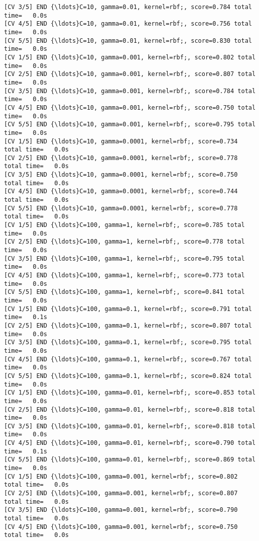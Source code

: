 \documentclass[11pt]{article}
\begin{document}
\begin{Verbatim}[commandchars=\\\{\}]
[CV 3/5] END {\ldots}C=10, gamma=0.01, kernel=rbf;, score=0.784 total time=   0.0s
[CV 4/5] END {\ldots}C=10, gamma=0.01, kernel=rbf;, score=0.756 total time=   0.0s
[CV 5/5] END {\ldots}C=10, gamma=0.01, kernel=rbf;, score=0.830 total time=   0.0s
[CV 1/5] END {\ldots}C=10, gamma=0.001, kernel=rbf;, score=0.802 total time=   0.0s
[CV 2/5] END {\ldots}C=10, gamma=0.001, kernel=rbf;, score=0.807 total time=   0.0s
[CV 3/5] END {\ldots}C=10, gamma=0.001, kernel=rbf;, score=0.784 total time=   0.0s
[CV 4/5] END {\ldots}C=10, gamma=0.001, kernel=rbf;, score=0.750 total time=   0.0s
[CV 5/5] END {\ldots}C=10, gamma=0.001, kernel=rbf;, score=0.795 total time=   0.0s
[CV 1/5] END {\ldots}C=10, gamma=0.0001, kernel=rbf;, score=0.734 total time=   0.0s
[CV 2/5] END {\ldots}C=10, gamma=0.0001, kernel=rbf;, score=0.778 total time=   0.0s
[CV 3/5] END {\ldots}C=10, gamma=0.0001, kernel=rbf;, score=0.750 total time=   0.0s
[CV 4/5] END {\ldots}C=10, gamma=0.0001, kernel=rbf;, score=0.744 total time=   0.0s
[CV 5/5] END {\ldots}C=10, gamma=0.0001, kernel=rbf;, score=0.778 total time=   0.0s
[CV 1/5] END {\ldots}C=100, gamma=1, kernel=rbf;, score=0.785 total time=   0.0s
[CV 2/5] END {\ldots}C=100, gamma=1, kernel=rbf;, score=0.778 total time=   0.0s
[CV 3/5] END {\ldots}C=100, gamma=1, kernel=rbf;, score=0.795 total time=   0.0s
[CV 4/5] END {\ldots}C=100, gamma=1, kernel=rbf;, score=0.773 total time=   0.0s
[CV 5/5] END {\ldots}C=100, gamma=1, kernel=rbf;, score=0.841 total time=   0.0s
[CV 1/5] END {\ldots}C=100, gamma=0.1, kernel=rbf;, score=0.791 total time=   0.1s
[CV 2/5] END {\ldots}C=100, gamma=0.1, kernel=rbf;, score=0.807 total time=   0.0s
[CV 3/5] END {\ldots}C=100, gamma=0.1, kernel=rbf;, score=0.795 total time=   0.0s
[CV 4/5] END {\ldots}C=100, gamma=0.1, kernel=rbf;, score=0.767 total time=   0.0s
[CV 5/5] END {\ldots}C=100, gamma=0.1, kernel=rbf;, score=0.824 total time=   0.0s
[CV 1/5] END {\ldots}C=100, gamma=0.01, kernel=rbf;, score=0.853 total time=   0.0s
[CV 2/5] END {\ldots}C=100, gamma=0.01, kernel=rbf;, score=0.818 total time=   0.0s
[CV 3/5] END {\ldots}C=100, gamma=0.01, kernel=rbf;, score=0.818 total time=   0.0s
[CV 4/5] END {\ldots}C=100, gamma=0.01, kernel=rbf;, score=0.790 total time=   0.1s
[CV 5/5] END {\ldots}C=100, gamma=0.01, kernel=rbf;, score=0.869 total time=   0.0s
[CV 1/5] END {\ldots}C=100, gamma=0.001, kernel=rbf;, score=0.802 total time=   0.0s
[CV 2/5] END {\ldots}C=100, gamma=0.001, kernel=rbf;, score=0.807 total time=   0.0s
[CV 3/5] END {\ldots}C=100, gamma=0.001, kernel=rbf;, score=0.790 total time=   0.0s
[CV 4/5] END {\ldots}C=100, gamma=0.001, kernel=rbf;, score=0.750 total time=   0.0s

\end{Verbatim}
\end{document}
